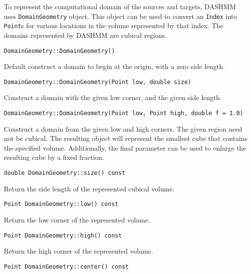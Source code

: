 To represent the computational domain of the sources and targets, DASHMM
uses \texttt{DomainGeometry} object. This object can be used to convert
an \texttt{Index} into \texttt{Point}s for various locations in the volume
represented by that index. The domains represented by DASHMM are cubical
regions.

\begin{lstlisting}
DomainGeometry::DomainGeometry()
\end{lstlisting}

\noindent Default construct a domain to begin at the origin, with a zero
side length.

\begin{lstlisting}
DomainGeometry::DomainGeometry(Point low, double size)
\end{lstlisting}

\noindent Construct a domain with the given low corner, and the given side
length.

\begin{lstlisting}
DomainGeometry::DomainGeometry(Point low, Point high, double f = 1.0)
\end{lstlisting}

\noindent Construct a domain from the given low and high corners. The given
region need not be cubical. The resulting object will represent the smallest
cube that contains the specified volume. Additionally, the final parameter can
be used to enlarge the resulting cube by a fixed fraction.

\begin{lstlisting}
double DomainGeometry::size() const
\end{lstlisting}

\noindent Return the side length of the represented cubical volume.

\begin{lstlisting}
Point DomainGeometry::low() const
\end{lstlisting}

\noindent Return the low corner of the represented volume.

\begin{lstlisting}
Point DomainGeometry::high() const
\end{lstlisting}

\noindent Return the high corner of the represented volume.\\

\begin{lstlisting}
Point DomainGeometry::center() const
\end{lstlisting}

